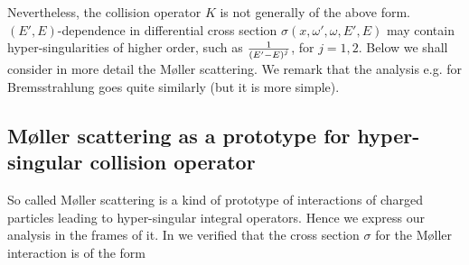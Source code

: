 \documentclass[a4paper,12pt,oneside,reqno]{amsart}
\theoremstyle{theorem}
\begin{document}
Nevertheless, the  collision operator $K$ is not generally of the above form. $(E',E)$-dependence in differential cross section 
$\sigma(x,\omega',\omega,E',E)$ may contain hyper-singularities of higher order, such as
${1\over{(E'-E)}^j}$, for $j=1,2$. 
Below we shall consider in more detail the M\o ller scattering. We remark that  the analysis e.g. for Bremsstrahlung goes quite similarly (but it is more simple).
 




\subsection{M\o ller scattering as a prototype for hyper-singular collision operator}\label{moller}

So called M\o ller scattering is a kind of prototype of interactions of charged particles leading to hyper-singular integral operators. Hence we express our analysis in the frames of it.
In \cite{tervo18-up} we verified that the cross section $\sigma$ for the 
M\o ller interaction is of the form
\end{document}
